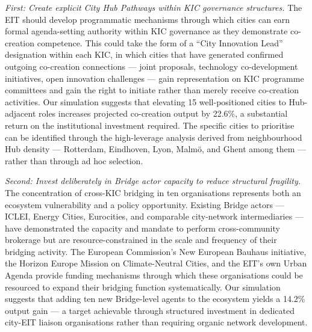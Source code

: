 \documentclass[review,12pt]{elsarticle}
\begin{document}
\textit{First: Create explicit City Hub Pathways within KIC governance structures.} The EIT should develop programmatic mechanisms through which cities can earn formal agenda-setting authority within KIC governance as they demonstrate co-creation competence. This could take the form of a ``City Innovation Lead'' designation within each KIC, in which cities that have generated confirmed outgoing co-creation connections --- joint proposals, technology co-development initiatives, open innovation challenges --- gain representation on KIC programme committees and gain the right to initiate rather than merely receive co-creation activities. Our simulation suggests that elevating 15 well-positioned cities to Hub-adjacent roles increases projected co-creation output by 22.6\%, a substantial return on the institutional investment required. The specific cities to prioritise can be identified through the high-leverage analysis derived from neighbourhood Hub density --- Rotterdam, Eindhoven, Lyon, Malmö, and Ghent among them --- rather than through ad hoc selection.

\textit{Second: Invest deliberately in Bridge actor capacity to reduce structural fragility.} The concentration of cross-KIC bridging in ten organisations represents both an ecosystem vulnerability and a policy opportunity. Existing Bridge actors --- ICLEI, Energy Cities, Eurocities, and comparable city-network intermediaries --- have demonstrated the capacity and mandate to perform cross-community brokerage but are resource-constrained in the scale and frequency of their bridging activity. The European Commission's New European Bauhaus initiative, the Horizon Europe Mission on Climate-Neutral Cities, and the EIT's own Urban Agenda provide funding mechanisms through which these organisations could be resourced to expand their bridging function systematically. Our simulation suggests that adding ten new Bridge-level agents to the ecosystem yields a 14.2\% output gain --- a target achievable through structured investment in dedicated city-EIT liaison organisations rather than requiring organic network development.
\end{document}

